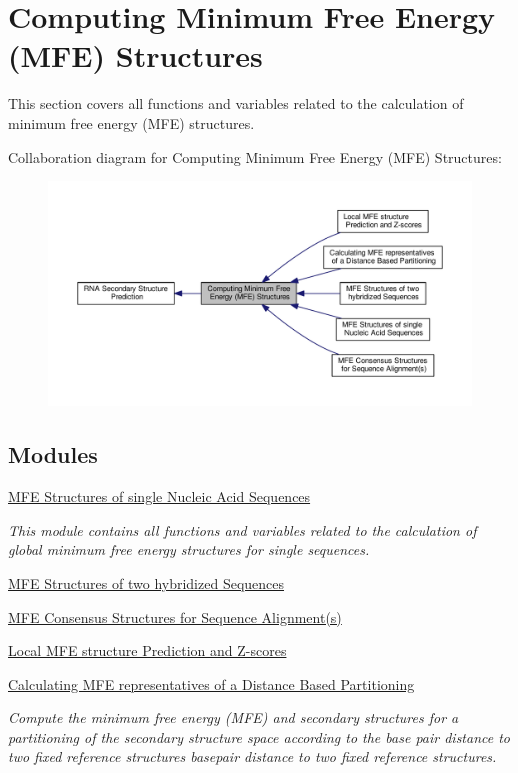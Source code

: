 \hypertarget{group__mfe__fold}{\section{Computing Minimum Free Energy (M\-F\-E) Structures}
\label{group__mfe__fold}
}


This section covers all functions and variables related to the calculation of minimum free energy (M\-F\-E) structures.  


Collaboration diagram for Computing Minimum Free Energy (M\-F\-E) Structures\-:
\nopagebreak
\begin{figure}[H]
\begin{center}
\leavevmode
\includegraphics[width=350pt]{group__mfe__fold}
\end{center}
\end{figure}
\subsection*{Modules}
\begin{DoxyCompactItemize}
\item 
\hyperlink{group__mfe__fold__single}{M\-F\-E Structures of single Nucleic Acid Sequences}
\begin{DoxyCompactList}\small\item\em This module contains all functions and variables related to the calculation of global minimum free energy structures for single sequences. \end{DoxyCompactList}\item 
\hyperlink{group__mfe__cofold}{M\-F\-E Structures of two hybridized Sequences}
\item 
\hyperlink{group__consensus__mfe__fold}{M\-F\-E Consensus Structures for Sequence Alignment(s)}
\item 
\hyperlink{group__local__mfe__fold}{Local M\-F\-E structure Prediction and Z-\/scores}
\item 
\hyperlink{group__kl__neighborhood__mfe}{Calculating M\-F\-E representatives of a Distance Based Partitioning}
\begin{DoxyCompactList}\small\item\em Compute the minimum free energy (M\-F\-E) and secondary structures for a partitioning of the secondary structure space according to the base pair distance to two fixed reference structures basepair distance to two fixed reference structures. \end{DoxyCompactList}\end{DoxyCompactItemize}
